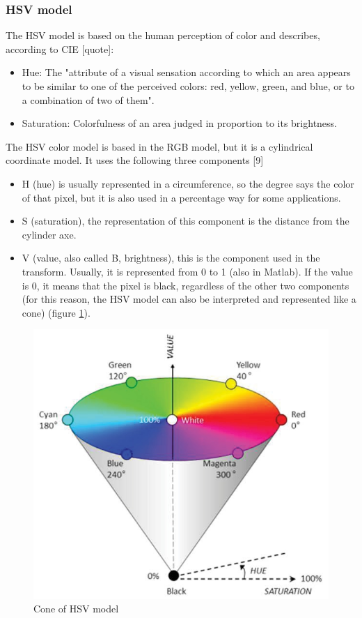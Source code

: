 \subsubsection{HSV model}
The HSV model is based on the human perception of color and describes, according to CIE [quote]:
\begin{itemize}
	\item Hue: The "attribute of a visual sensation according to which an area appears to be similar to one of the perceived colors: red, yellow, green, and blue, or to a combination of two of them".
	\item Saturation: Colorfulness of an area judged in proportion to its brightness.
\end{itemize}
The HSV color model is based in the RGB model, but it is a cylindrical coordinate model. It uses the following three components [9]

\begin{itemize}
	\item H (hue) is usually represented in a circumference, so the degree says the color of that pixel, but it is also used in a percentage way for some applications.
	\item S (saturation), the representation of this component is the distance from the cylinder axe.
	\item V (value, also called B, brightness), this is the component used in the transform. Usually, it is represented from 0 to 1 (also in Matlab). If the value is 0, it means that the pixel is black, regardless of the other two components (for this reason, the HSV model can also be interpreted and represented like a cone) (figure \ref{fig:HSVModel}).

\end{itemize}

\begin{figure}
	\centering
  	\includegraphics[scale=0.5]{images/ch2/HSVModel.jpg}
  	\caption{Cone of HSV model}
  	\label{fig:HSVModel}
\end{figure}

